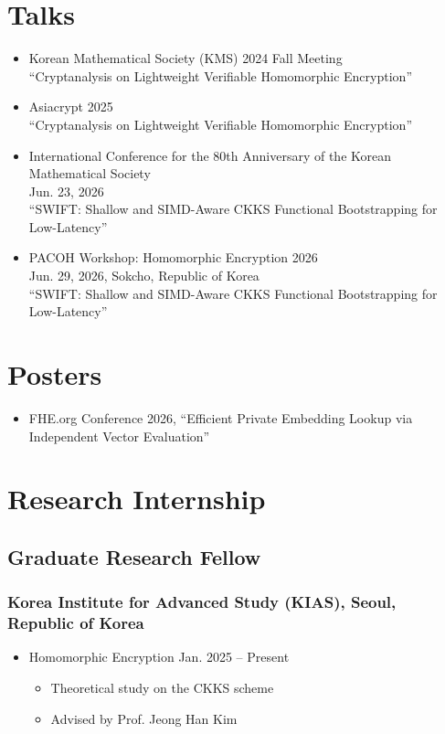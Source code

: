 \documentclass[11pt]{article}
\begin{document}
\section{Talks}
\begin{itemize}[itemsep=3pt,parsep=0pt]
    \emergencystretch=2em
    \item Korean Mathematical Society (KMS) 2024 Fall Meeting\\
    ``Cryptanalysis on Lightweight Verifiable Homomorphic Encryption''
    \item Asiacrypt 2025\\
    ``Cryptanalysis on Lightweight Verifiable Homomorphic Encryption''
    \item International Conference for the 80th Anniversary of the Korean Mathematical Society\\
    {\small Jun. 23, 2026}\\
    ``SWIFT: Shallow and SIMD-Aware CKKS Functional Bootstrapping for Low-Latency''
    \item PACOH Workshop: Homomorphic Encryption 2026\\
    {\small Jun. 29, 2026, Sokcho, Republic of Korea}\\
    ``SWIFT: Shallow and SIMD-Aware CKKS Functional Bootstrapping for Low-Latency''
\end{itemize}

\section{Posters}
\begin{itemize}
    \item FHE.org Conference 2026, ``Efficient Private Embedding Lookup via Independent Vector Evaluation''
\end{itemize}

\section{Research Internship}

\subsection{Graduate Research Fellow}
\subsubsection{Korea Institute for Advanced Study (KIAS), Seoul, Republic of Korea}
\begin{itemize}
    \item Homomorphic Encryption \hfill Jan. 2025 -- Present
    \begin{itemize}
        \item Theoretical study on the CKKS scheme
        \item Advised by Prof. Jeong Han Kim
    \end{itemize}
\end{itemize}
\end{document}
